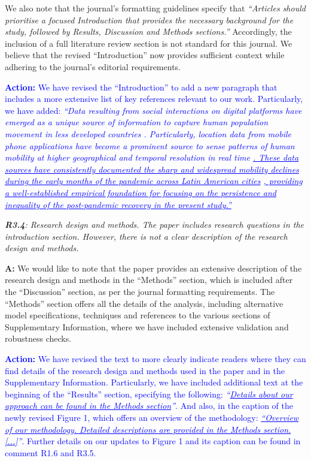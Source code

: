 \documentclass[12pt,a4paper,oneside, reqno]{amsart}
\begin{document}
We also note that the journal’s formatting guidelines specify that \textit{``Articles should prioritise a focused Introduction that provides the necessary background for the study, followed by Results, Discussion and Methods sections.''} Accordingly, the inclusion of a full literature review section is not standard for this journal. We believe that the revised ``Introduction'' now provides sufficient context while adhering to the journal’s editorial requirements.

\textcolor{blue}{
\textbf{Action:} We have revised the ``Introduction'' to add a new paragraph that includes a more extensive list of key references relevant to our work. Particularly, we have added: \textit{``Data resulting from social interactions on digital platforms have emerged as a unique source of information to capture human population movement in less developed countries \parencite{rowe2023big}. Particularly, location data from mobile phone applications have become a prominent source to sense patterns of human mobility at higher geographical and temporal resolution in real time \parencite{calafiore2023, iradukunda2025}\ul{. These data sources have consistently documented the sharp and widespread mobility declines during the early months of the pandemic across Latin American cities} \parencite{RoweCCA24, covidMexico24, elejalde2024, demography25}\ul{, providing a well-established empirical foundation for focusing on the persistence and inequality of the post-pandemic recovery in the present study.''}}
}

\setlength{\leftskip}{0cm} \textit{\textbf{R3.4}: Research design and methods. The paper includes research questions in the introduction section. However, there is not a clear description of the research design and methods.}

\setlength{\leftskip}{1cm}\textbf{A:} We would like to note that the paper provides an extensive description of the research design and methods in the ``Methods'' section, which is included after the ``Discussion'' section, as per the journal formatting requirements. The ``Methods'' section offers all the details of the analysis, including alternative model specifications, techniques and references to the various sections of Supplementary Information, where we have included extensive validation and robustness checks. 

\textcolor{blue}{
\textbf{Action:} We have revised the text to more clearly indicate readers where they can find details of the research design and methods used in the paper and in the Supplementary Information. Particularly, we have included additional text at the beginning of the ``Results'' section, specifying the following: \textit{``\ul{Details about our approach can be found in the Methods section}''}. And also, in the caption of the newly revised Figure 1, which offers an overview of the methodology: \textit{\ul{``Overview of our methodology. Detailed descriptions are provided in the Methods section. [...]}''}. Further details on our updates to Figure 1 and its caption can be found in comment R1.6 and R3.5.
}
\end{document}
